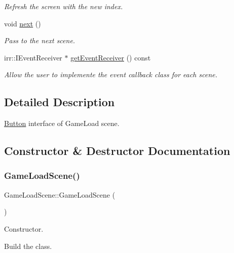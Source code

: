 \begin{DoxyCompactItemize}
\begin{DoxyCompactList}\small\item\em Refresh the screen with the new index. \end{DoxyCompactList}\item 
\mbox{\label{classGameLoadScene_aa00e2695ad042ee9a637ab0d5c08b054}} 
void \hyperlink{classGameLoadScene_aa00e2695ad042ee9a637ab0d5c08b054}{next} ()
\begin{DoxyCompactList}\small\item\em Pass to the next scene. \end{DoxyCompactList}\item 
irr\+::\+I\+Event\+Receiver $\ast$ \hyperlink{classGameLoadScene_a81807790ad65bd2cf97a1e543cae2b74}{get\+Event\+Receiver} () const
\begin{DoxyCompactList}\small\item\em Allow the user to implemente the event callback class for each scene. \end{DoxyCompactList}\end{DoxyCompactItemize}


\subsection{Detailed Description}
\hyperlink{classButton}{Button} interface of Game\+Load scene. 

\subsection{Constructor \& Destructor Documentation}
\mbox{\label{classGameLoadScene_a225786d3826577aa3743164b6262dc2b}} 
\subsubsection{\texorpdfstring{Game\+Load\+Scene()}{GameLoadScene()}}
{\footnotesize\ttfamily Game\+Load\+Scene\+::\+Game\+Load\+Scene (\begin{DoxyParamCaption}{ }\end{DoxyParamCaption})}



Constructor. 

Build the class. \mbox{\label{classGameLoadScene_a39c0f378455520c08d21e0642f35cd9b}} 
